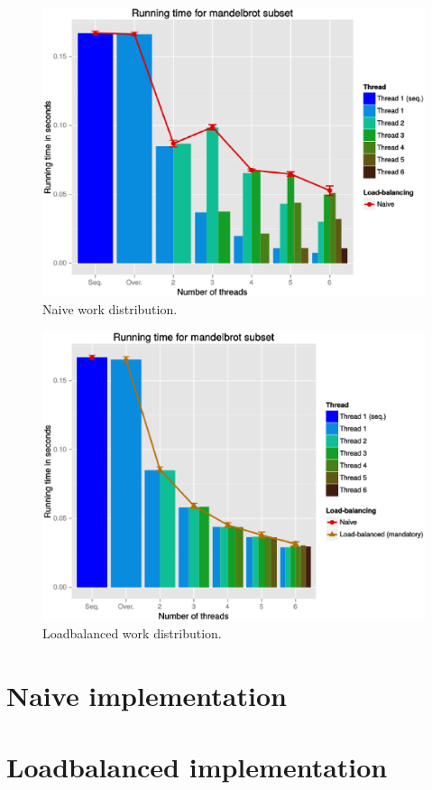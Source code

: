 \documentclass[10pt,twocolumn]{article}
\begin{document}
\begin{figure}[H]
	\begin{center}
		\includegraphics[scale=0.3]{figurer/naive_time.eps}
	\end{center}
	\caption{Naive work distribution.}
	\label{fig:naive_time}
\end{figure}

\begin{figure}[H]
	\begin{center}
		\includegraphics[scale=0.3]{figurer/loadbalance_time.eps}
	\end{center}
	\caption{Loadbalanced work distribution.}
	\label{fig:loadbalance_time}
\end{figure}


\newpage

\onecolumn
\appendix
\section{Naive implementation} \label{app:naive}

\section{Loadbalanced implementation} \label{app:loadbalance}

\end{document}
